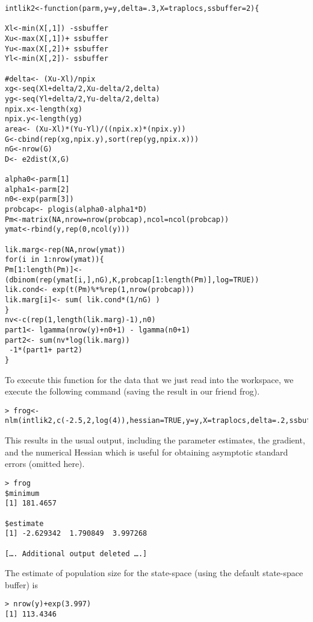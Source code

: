 \begin{verbatim}
intlik2<-function(parm,y=y,delta=.3,X=traplocs,ssbuffer=2){

Xl<-min(X[,1]) -ssbuffer
Xu<-max(X[,1])+ ssbuffer
Yu<-max(X[,2])+ ssbuffer
Yl<-min(X[,2])- ssbuffer

#delta<- (Xu-Xl)/npix
xg<-seq(Xl+delta/2,Xu-delta/2,delta) 
yg<-seq(Yl+delta/2,Yu-delta/2,delta) 
npix.x<-length(xg)
npix.y<-length(yg)
area<- (Xu-Xl)*(Yu-Yl)/((npix.x)*(npix.y))
G<-cbind(rep(xg,npix.y),sort(rep(yg,npix.x)))
nG<-nrow(G)
D<- e2dist(X,G) 

alpha0<-parm[1]
alpha1<-parm[2]
n0<-exp(parm[3])
probcap<- plogis(alpha0-alpha1*D)
Pm<-matrix(NA,nrow=nrow(probcap),ncol=ncol(probcap))
ymat<-rbind(y,rep(0,ncol(y)))

lik.marg<-rep(NA,nrow(ymat))
for(i in 1:nrow(ymat)){
Pm[1:length(Pm)]<- (dbinom(rep(ymat[i,],nG),K,probcap[1:length(Pm)],log=TRUE))
lik.cond<- exp(t(Pm)%*%rep(1,nrow(probcap)))
lik.marg[i]<- sum( lik.cond*(1/nG) )  
}                                                 
nv<-c(rep(1,length(lik.marg)-1),n0)
part1<- lgamma(nrow(y)+n0+1) - lgamma(n0+1)
part2<- sum(nv*log(lik.marg))
 -1*(part1+ part2)
}
\end{verbatim}

To execute this function for the data that we just read into the
workspace, we execute the following command (saving the result in our
friend frog).

\begin{verbatim}
> frog<-nlm(intlik2,c(-2.5,2,log(4)),hessian=TRUE,y=y,X=traplocs,delta=.2,ssbuffer=2)
\end{verbatim}

This results in the usual output, including the parameter estimates,
the gradient, and the numerical Hessian which is useful for obtaining
asymptotic standard errors (omitted here).

\begin{verbatim}
> frog
$minimum
[1] 181.4657

$estimate
[1] -2.629342  1.790849  3.997268

[…. Additional output deleted ….]
\end{verbatim}

The estimate of population size for the state-space (using the default state-space buffer) is

\begin{verbatim}
> nrow(y)+exp(3.997)
[1] 113.4346
\end{verbatim}


